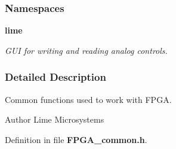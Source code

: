 \subsubsection*{Namespaces}
\begin{DoxyCompactItemize}
\item 
 {\bf lime}
\begin{DoxyCompactList}\small\item\em G\+UI for writing and reading analog controls. \end{DoxyCompactList}\end{DoxyCompactItemize}


\subsubsection{Detailed Description}
Common functions used to work with F\+P\+GA. 

\begin{DoxyAuthor}{Author}
Lime Microsystems 
\end{DoxyAuthor}


Definition in file {\bf F\+P\+G\+A\+\_\+common.\+h}.

